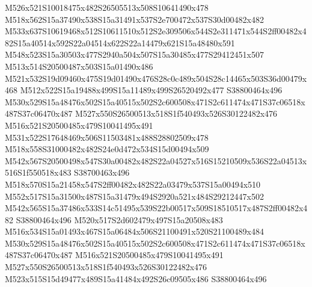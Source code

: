 \documentclass{article}
\begin{document}
\begin{multicols}{2}
M526x521S10018475x482S26505513x508S10641490x478 M518x562S15a37490x538S15a31491x537S2e700472x537S30d00482x482 M533x637S10619468x512S10611510x512S2e309506x544S2e311471x544S2ff00482x482S15a40514x592S22a04514x622S22a14479x621S15a48480x591 M548x523S15a30503x477S2940a504x507S15a30485x477S29412451x507 M513x514S20500487x503S15a01490x486 M521x532S19d09460x475S19d01490x476S28c0c489x504S28c14465x503S36d00479x468 M512x522S15a19488x499S15a11489x499S26520492x477 S38800464x496 M530x529S15a48476x502S15a40515x502S2c600508x471S2c611474x471S37c06518x487S37c06470x487 M527x550S26500513x518S1f540493x526S30122482x476 M516x521S20500485x479S10041495x491 M531x522S17648469x506S11503481x488S28802509x478 M518x558S31000482x482S24e0d472x534S15d00494x509 M542x567S20500498x547S30a00482x482S22a04527x516S15210509x536S22a04513x516S1f550518x483 S38700463x496 M518x570S15a21458x547S2ff00482x482S22a03479x537S15a00494x510 M552x517S15a31500x487S15a31479x494S2920a521x484S29212447x502 M542x565S15a37486x533S14c51495x539S22b00517x509S18510517x487S2ff00482x482 S38800464x496 M520x517S2d602479x497S15a20508x483 M516x534S15a01493x467S15a06484x506S21100491x520S21100489x484 M530x529S15a48476x502S15a40515x502S2c600508x471S2c611474x471S37c06518x487S37c06470x487 M516x521S20500485x479S10041495x491 M527x550S26500513x518S1f540493x526S30122482x476 M523x515S15d49477x489S15a41484x492S26c09505x486 S38800464x496


\end{multicols}
\end{document}
